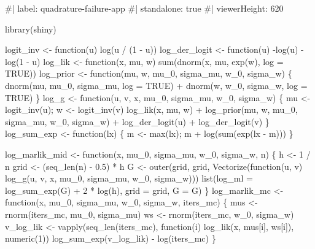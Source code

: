 \documentclass[
  letterpaper,
  DIV=11,
  numbers=noendperiod]{scrreprt}
\newenvironment{Shaded}{\begin{snugshade}}{\end{snugshade}}
\newcommand{\NormalTok}[1]{\textcolor[rgb]{0.00,0.23,0.31}{#1}}
\begin{document}
\begin{Shaded}
\begin{Highlighting}[]
\NormalTok{\#| label: quadrature{-}failure{-}app}
\NormalTok{\#| standalone: true}
\NormalTok{\#| viewerHeight: 620}

\NormalTok{library(shiny)}

\NormalTok{logit\_inv     \textless{}{-} function(u) log(u / (1 {-} u))}
\NormalTok{log\_der\_logit \textless{}{-} function(u) {-}log(u) {-} log(1 {-} u)}
\NormalTok{log\_lik   \textless{}{-} function(x, mu, w) sum(dnorm(x, mu, exp(w), log = TRUE))}
\NormalTok{log\_prior \textless{}{-} function(mu, w, mu\_0, sigma\_mu, w\_0, sigma\_w) \{}
\NormalTok{    dnorm(mu, mu\_0, sigma\_mu, log = TRUE) + dnorm(w, w\_0, sigma\_w, log = TRUE)}
\NormalTok{\}}
\NormalTok{log\_g \textless{}{-} function(u, v, x, mu\_0, sigma\_mu, w\_0, sigma\_w) \{}
\NormalTok{    mu \textless{}{-} logit\_inv(u); w \textless{}{-} logit\_inv(v)}
\NormalTok{    log\_lik(x, mu, w) + log\_prior(mu, w, mu\_0, sigma\_mu, w\_0, sigma\_w) +}
\NormalTok{        log\_der\_logit(u) + log\_der\_logit(v)}
\NormalTok{\}}
\NormalTok{log\_sum\_exp \textless{}{-} function(lx) \{ m \textless{}{-} max(lx); m + log(sum(exp(lx {-} m))) \}}

\NormalTok{log\_marlik\_mid \textless{}{-} function(x, mu\_0, sigma\_mu, w\_0, sigma\_w, n) \{}
\NormalTok{    h \textless{}{-} 1 / n}
\NormalTok{    grid \textless{}{-} (seq\_len(n) {-} 0.5) * h}
\NormalTok{    G \textless{}{-} outer(grid, grid, Vectorize(function(u, v) log\_g(u, v, x, mu\_0, sigma\_mu, w\_0, sigma\_w)))}
\NormalTok{    list(log\_ml = log\_sum\_exp(G) + 2 * log(h), grid = grid, G = G)}
\NormalTok{\}}
\NormalTok{log\_marlik\_mc \textless{}{-} function(x, mu\_0, sigma\_mu, w\_0, sigma\_w, iters\_mc) \{}
\NormalTok{    mus \textless{}{-} rnorm(iters\_mc, mu\_0, sigma\_mu)}
\NormalTok{    ws  \textless{}{-} rnorm(iters\_mc, w\_0, sigma\_w)}
\NormalTok{    v\_log\_lik \textless{}{-} vapply(seq\_len(iters\_mc), function(i) log\_lik(x, mus[i], ws[i]), numeric(1))}
\NormalTok{    log\_sum\_exp(v\_log\_lik) {-} log(iters\_mc)}
\NormalTok{\}}


\end{Highlighting}
\end{Shaded}
\end{document}
